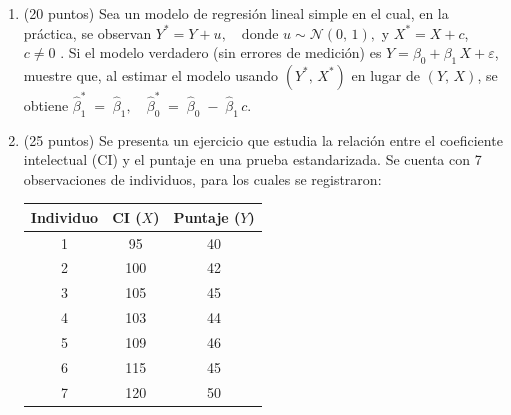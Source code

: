 \documentclass[10pt,a4paper]{article}
\begin{document}
\begin{enumerate}
\item (20 puntos) Sea un modelo de regresión lineal simple en el cual, en la práctica, se observan $
Y^* = Y + u, \quad \text{donde } u \sim \mathcal{N}(0,\,1),
$ y $
X^* = X + c$, \quad {} $c \neq 0$ . Si el modelo verdadero (sin errores de medición) es $
Y = \beta_0 + \beta_1 \, X + \varepsilon$, muestre que, al estimar el modelo usando \((Y^*,\,X^*)\) en lugar de \((Y,\,X)\), se obtiene $\hat{\beta}_1^* \;=\; \hat{\beta}_1,
\quad
\hat{\beta}_0^* \;=\; \hat{\beta}_0 \;-\;\hat{\beta}_1 \, c.
$






\item (25 puntos) Se presenta un ejercicio que estudia la relación entre el coeficiente intelectual (CI) y el puntaje en una prueba estandarizada. Se cuenta con 7 observaciones de individuos, para los cuales se registraron:

\begin{center}
\begin{tabular}{|c|c|c|}
\hline
\textbf{Individuo} & \textbf{CI} ($X$) & \textbf{Puntaje} ($Y$)\\
\hline
1 & 95  & 40 \\
2 & 100 & 42 \\
3 & 105 & 45 \\
4 & 103 & 44 \\
5 & 109 & 46 \\
6 & 115 & 45 \\
7 & 120 & 50 \\
\hline
\end{tabular}
\end{center}


\end{enumerate}
\end{document}
